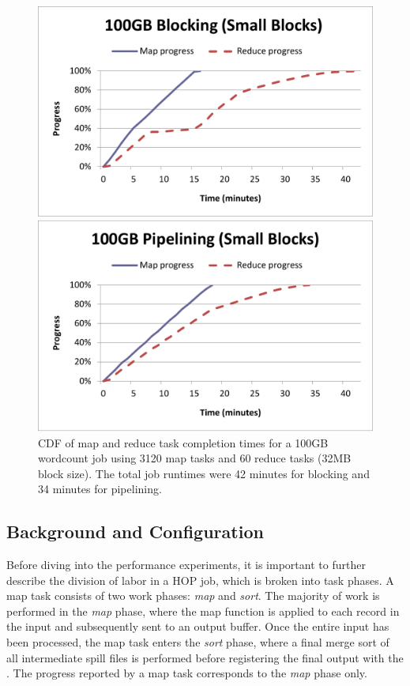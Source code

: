 \begin{figure}[t]
\begin{minipage}{0.5\linewidth}
  \centering
        \includegraphics[width=0.95\linewidth]{figures/wc_100gb_3120m60r_blocking}
\end{minipage}
\begin{minipage}{0.5\linewidth}
  \centering
        \includegraphics[width=0.95\linewidth]{figures/wc_100gb_3120m60r_pipeline}
\end{minipage}
\caption{CDF of map and reduce task completion times for a 100GB wordcount job
  using 3120 map tasks and 60 reduce tasks (32MB block size). The total job
  runtimes were 42 minutes for blocking and 34 minutes for pipelining.}
\label{fig:wc5}
\end{figure}

\subsection{Background and Configuration}
Before diving into the performance experiments, it is important to further
describe the division of labor in a HOP job, which is broken into task phases. A
map task consists of two work phases: {\em map} and {\em sort}. The majority
of work is performed in the {\em map} phase, where the map function is applied
to each record in the input and subsequently sent to an output buffer.  Once the
entire input has been processed, the map task enters the {\em sort} phase, where
a final merge sort of all intermediate spill files is performed before
registering the final output with the \TT. The progress reported by a map task
corresponds to the {\em map} phase only.

